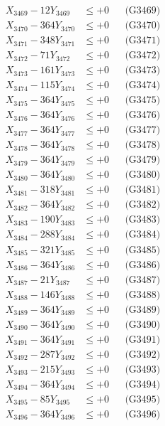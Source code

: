 \documentclass[a4paper,10pt]{article}
\begin{document}
{\begin{align}
X_{3469} - 12Y_{3469} &\leq +0 && \text{(G3469)} \\
X_{3470} - 364Y_{3470} &\leq +0 && \text{(G3470)} \\
\allowbreak
X_{3471} - 348Y_{3471} &\leq +0 && \text{(G3471)} \\
X_{3472} - 71Y_{3472} &\leq +0 && \text{(G3472)} \\
X_{3473} - 161Y_{3473} &\leq +0 && \text{(G3473)} \\
X_{3474} - 115Y_{3474} &\leq +0 && \text{(G3474)} \\
X_{3475} - 364Y_{3475} &\leq +0 && \text{(G3475)} \\
X_{3476} - 364Y_{3476} &\leq +0 && \text{(G3476)} \\
X_{3477} - 364Y_{3477} &\leq +0 && \text{(G3477)} \\
X_{3478} - 364Y_{3478} &\leq +0 && \text{(G3478)} \\
X_{3479} - 364Y_{3479} &\leq +0 && \text{(G3479)} \\
X_{3480} - 364Y_{3480} &\leq +0 && \text{(G3480)} \\
\allowbreak
X_{3481} - 318Y_{3481} &\leq +0 && \text{(G3481)} \\
X_{3482} - 364Y_{3482} &\leq +0 && \text{(G3482)} \\
X_{3483} - 190Y_{3483} &\leq +0 && \text{(G3483)} \\
X_{3484} - 288Y_{3484} &\leq +0 && \text{(G3484)} \\
X_{3485} - 321Y_{3485} &\leq +0 && \text{(G3485)} \\
X_{3486} - 364Y_{3486} &\leq +0 && \text{(G3486)} \\
X_{3487} - 21Y_{3487} &\leq +0 && \text{(G3487)} \\
X_{3488} - 146Y_{3488} &\leq +0 && \text{(G3488)} \\
X_{3489} - 364Y_{3489} &\leq +0 && \text{(G3489)} \\
X_{3490} - 364Y_{3490} &\leq +0 && \text{(G3490)} \\
\allowbreak
X_{3491} - 364Y_{3491} &\leq +0 && \text{(G3491)} \\
X_{3492} - 287Y_{3492} &\leq +0 && \text{(G3492)} \\
X_{3493} - 215Y_{3493} &\leq +0 && \text{(G3493)} \\
X_{3494} - 364Y_{3494} &\leq +0 && \text{(G3494)} \\
X_{3495} - 85Y_{3495} &\leq +0 && \text{(G3495)} \\
X_{3496} - 364Y_{3496} &\leq +0 && \text{(G3496)} \\

\end{align}}
\end{document}
